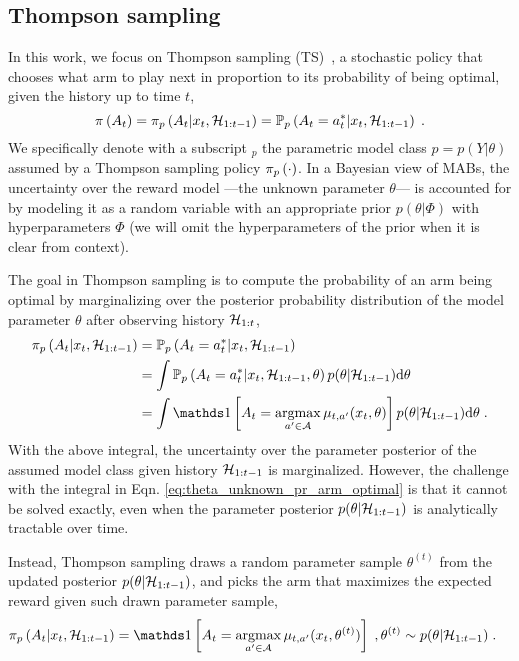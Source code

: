 \subsection{Thompson sampling}
\label{ssec:thompson_sampling}
In this work, we focus on Thompson sampling (TS)~\citep{j-Thompson1933,j-Russo2018}, a stochastic policy that chooses what arm to play next in proportion to its probability of being optimal, given the history up to time $t$, \ie
\begin{equation}
\pi_{}\left( A_t \right) = \pi_{p}\left( A_t|x_{t}, \mathcal{H}_{1:t-1} \right)= \mathbb{P}_{p}\left( A_t=a_{t}^*|x_{t}, \mathcal{H}_{1:t-1} \right) \; .
\end{equation}
We specifically denote with a subscript ${}_{p}$ the parametric model class $p=p(Y|\theta)$ assumed by a Thompson sampling policy $\pi_{p}\left( \cdot \right)$.
In a Bayesian view of MABs, the uncertainty over the reward model ---the unknown parameter $\theta$--- is accounted for by modeling it as a random variable with an appropriate prior $p(\theta|\varPhi)$ with hyperparameters $\varPhi$ (we will omit the hyperparameters of the prior when it is clear from context).

The goal in Thompson sampling is to compute the probability of an arm being optimal by marginalizing over the posterior probability distribution of the model parameter $\theta$ after observing history $\mathcal{H}_{1:t}$,
\begin{align}
\myPi{p}{A_t|x_{t},\HH_{1:t-1}} &=\myProb{p}{A_t=a_{t}^*|x_{t},\HH_{1:t-1}} \nonumber \\
& = \int \myProb{p}{A_t=a_{t}^*|x_{t},\HH_{1:t-1},\theta} p(\theta|\HH_{1:t-1}) \dd{\theta} \nonumber \\
& =\int \myind{A_t=\argmax_{a^\prime \in \A} \mu_{t,a^\prime}(x_{t},\theta)} p(\theta|\HH_{1:t-1}) \dd{\theta} \; .
\label{eq:theta_unknown_pr_arm_optimal}
\end{align}
With the above integral, the uncertainty over the parameter posterior of the assumed model class given history $\mathcal{H}_{1:t-1}$ is marginalized.
However, the challenge with the integral in Eqn. \eqref{eq:theta_unknown_pr_arm_optimal} is that it cannot be solved exactly, even when the parameter posterior $p(\theta|\mathcal{H}_{1:t-1})$ is analytically tractable over time.

Instead, Thompson sampling draws a random parameter sample $\theta^{(t)}$ from the updated posterior $p(\theta|\mathcal{H}_{1:t-1})$, and picks the arm that maximizes the expected reward given such drawn parameter sample,
\begin{align}
\myPi{p}{A_t|x_{t},\HH_{1:t-1}}&=\myind{A_t=\argmax_{a^\prime \in \A} \mu_{t,a^\prime}(x_{t},\theta^{(t)})} \;, \theta^{(t)} \sim p(\theta|\HH_{1:t-1}) \;.
\end{align}

